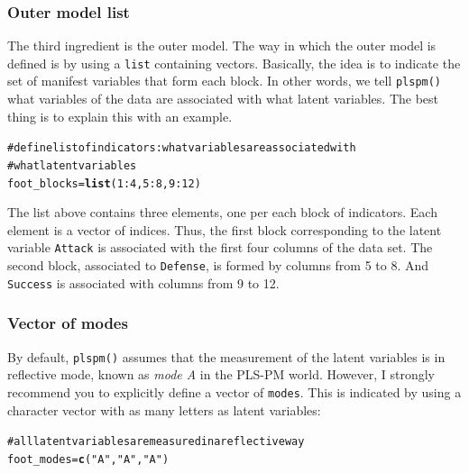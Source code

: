 \documentclass[12pt]{book}\usepackage{graphicx, color}
\makeatletter
\newcommand{\hlfunctioncall}[1]{\textcolor[rgb]{0.501960784313725,0,0.329411764705882}{\textbf{#1}}}%
\newcommand{\hlstring}[1]{\textcolor[rgb]{0.6,0.6,1}{#1}}%
\newcommand{\hlcomment}[1]{\textcolor[rgb]{0.180392156862745,0.6,0.341176470588235}{#1}}%
\newenvironment{kframe}{%
 \def\at@end@of@kframe{}%
 \ifinner\ifhmode%
  \def\at@end@of@kframe{\end{minipage}}%
  \begin{minipage}{\columnwidth}%
 \fi\fi%
 \def\FrameCommand##1{\hskip\@totalleftmargin \hskip-\fboxsep
 \colorbox{shadecolor}{##1}\hskip-\fboxsep
     \hskip-\linewidth \hskip-\@totalleftmargin \hskip\columnwidth}%
 \MakeFramed {\advance\hsize-\width
   \@totalleftmargin\z@ \linewidth\hsize
   \@setminipage}}%
 {\par\unskip\endMakeFramed%
 \at@end@of@kframe}
\newenvironment{knitrout}{}{} %
\newcommand{\fplspm}{\texttt{plspm()}}
\newcommand{\code}[1]{\texttt{#1}}
\makeatother
\begin{document}
\subsubsection*{Outer model list}
The third ingredient is the outer model. The way in which the outer model is defined is by using a \texttt{list} containing vectors. Basically, the idea is to indicate the set of manifest variables that form each block. In other words, we tell \fplspm{} what variables of the data are associated with what latent variables. The best thing is to explain this with an example.
\begin{knitrout}
\color{fgcolor}\begin{kframe}
\begin{alltt}
\hlcomment{# define list of indicators: what variables are associated with}
\hlcomment{# what latent variables}
foot_blocks = \hlfunctioncall{list}(1:4, 5:8, 9:12)
\end{alltt}
\end{kframe}
\end{knitrout}

The list above contains three elements, one per each block of indicators. Each element is a vector of indices. Thus, the first block corresponding to the latent variable \texttt{Attack} is associated with the first four columns of the data set. The second block, associated to \texttt{Defense}, is formed by columns from 5 to 8. And \texttt{Success} is associated with columns from 9 to 12. 


\subsubsection*{Vector of modes}
By default, \fplspm{} assumes that the measurement of the latent variables is in reflective mode, known as \textit{mode A} in the PLS-PM world. However, I strongly recommend you to explicitly define a vector of \code{modes}. This is indicated by using a character vector with as many letters as latent variables:
\begin{knitrout}
\color{fgcolor}\begin{kframe}
\begin{alltt}
\hlcomment{# all latent variables are measured in a reflective way}
foot_modes = \hlfunctioncall{c}(\hlstring{"A"}, \hlstring{"A"}, \hlstring{"A"})
\end{alltt}
\end{kframe}
\end{knitrout}
\end{document}
